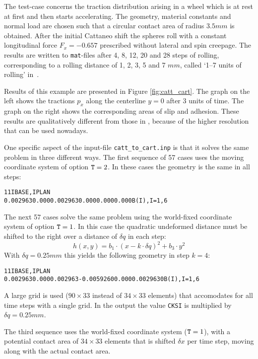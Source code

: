 \documentclass[12pt]{report}
\begin{document}
The test-case concerns the traction distribution arising in a wheel which
is at rest at first and then starts accelerating. The geometry, material
constants and normal load are chosen such that a circular contact area of
radius $3.5\unit{mm}$ is obtained. After the initial Cattaneo shift the spheres
roll with a constant longitudinal force $F_x=-0.657$ prescribed without
lateral and spin creepage. The results are written to {\tt mat}-files after
4, 8, 12, 20 and 28 steps of rolling, corresponding to a rolling distance
of 1, 2, 3, 5 and 7 $mm$, called `1--7 units of rolling' in~\cite{Kalker1990}.

Results of this example are presented in Figure \ref{fig:catt_cart}. The
graph on the left shows the tractions $p_x$ along the centerline $y=0$
after 3 units of time. The graph on the right shows the corresponding
areas of slip and adhesion. These results are qualitatively different from
those in \cite{Kalker1990}, because of the higher resolution that can be
used nowadays.

One specific aspect of the input-file {\tt catt\_to\_cart.inp} is that it
solves the same problem in three different ways. The first sequence of 57
cases uses the moving coordinate system of option ${\tt T}=2$. In these
cases the geometry is the same in all steps:
\begin{alltt}\small
    1   1                                                    IBASE, IPLAN
 0.002963   0.000    0.002963    0.000    0.000    0.000     B(I), I=1, 6
\end{alltt}
The next 57 cases solve the same problem using the world-fixed coordinate
system of option ${\tt T}=1$. In this case the quadratic undeformed distance
must be shifted to the right over a distance of $\delta q$ in each step:
\begin{equation}
  h(x,y) = b_1 \cdot (x-k\cdot\delta q)^2 + b_3\cdot  y^2
\end{equation}
With $\delta q=0.25\unit{mm}$ this yields the following geometry in step $k=4$:
\begin{alltt}\small
    1   1                                                    IBASE, IPLAN
 0.002963   0.000   0.002963 -0.0059260  0.000  0.0029630    B(I), I=1, 6
\end{alltt}
A large grid is used ($90\times 33$ instead of $34\times 33$ elements) 
that accomodates for all time steps with a single grid. In the output the
value {\tt CKSI} is multiplied by $\delta q=0.25\unit{mm}$.

The third sequence uses the world-fixed coordinate system (${\tt T}=1$),
with a potential contact area of $34\times 33$ elements that is shifted
$\delta x$ per time step, moving along with the actual contact area.
\end{document}
